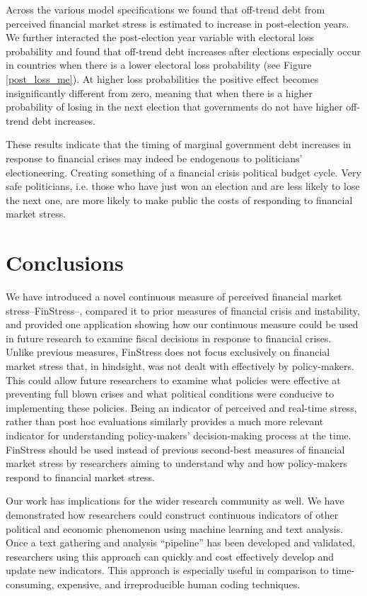 \documentclass[]{article}
\begin{document}
Across the various model specifications we found that off-trend debt from perceived financial market stress is estimated to increase in post-election years. We further interacted the post-election year variable with electoral loss probability and found that off-trend debt increases after elections especially occur in countries  when there is a lower electoral loss probability (see Figure \ref{post_loss_me}). At higher loss probabilities the positive effect becomes insignificantly different from zero, meaning that when there is a higher probability of losing in the next election that governments do not have higher off-trend debt increases.

These results indicate that the timing of marginal government debt increases in response to financial crises may indeed be endogenous to politicians' electioneering. Creating something of a financial crisis political budget cycle. Very safe politicians, i.e. those who have just won an election and are less likely to lose the next one, are more likely to make public the costs of responding to financial market stress.


\section{Conclusions}\label{conclusions}

We have introduced a novel continuous measure of perceived financial market stress--FinStress--, compared it to prior measures of financial crisis and instability, and provided one application showing how our continuous measure could be used in future research to examine fiscal decisions in response to financial crises. Unlike previous measures, FinStress does not focus exclusively on financial market stress that, in hindsight, was not dealt with effectively by policy-makers. This could allow future researchers to examine what policies were effective at preventing full blown crises and what political conditions were conducive to implementing these policies. Being an indicator of perceived and real-time stress, rather than post hoc evaluations similarly provides a much more relevant indicator for understanding policy-makers' decision-making process at the time. FinStress should be used instead of previous second-best measures of financial market stress by researchers aiming to understand why and how policy-makers respond to financial market stress.

Our work has implications for the wider research community as well. We have demonstrated how researchers could construct continuous indicators of other political and economic phenomenon using machine learning and text analysis. Once a text gathering and analysis ``pipeline'' \citep{Leek2015} has been developed and validated, researchers using this approach can quickly and cost effectively develop and update new indicators. This approach is especially useful in comparison to time-consuming, expensive, and irreproducible human coding techniques.
\end{document}
